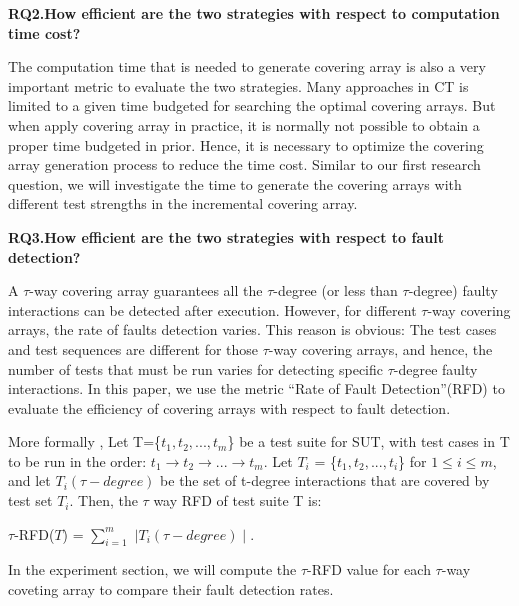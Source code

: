 \documentclass[conference]{IEEEtran}
\theoremstyle{definition}
\begin{document}
\textbf{RQ2.How efficient are the two strategies with respect to computation time cost?}

The computation time that is needed to generate covering array is also a very important metric to evaluate the two strategies. Many approaches in CT is limited to a given time budgeted for searching the optimal covering arrays.  But when apply covering array in practice, it is normally not possible to obtain a proper time budgeted in prior. Hence, it is necessary to optimize the covering array generation process to reduce the time cost. Similar to our first research question, we will investigate the time to generate the covering arrays with different test strengths in the incremental covering array.

\textbf{RQ3.How efficient are the two strategies with respect to fault detection?}

A $\tau$-way covering array guarantees all the $\tau$-degree (or less than $\tau$-degree) faulty interactions can be detected after execution. However, for different $\tau$-way covering arrays, the rate of faults detection varies.  This reason is obvious: The test cases and test sequences are different for those $\tau$-way covering arrays, and hence, the number of tests that must be run varies for detecting specific $\tau$-degree faulty interactions. In this paper, we use the metric ``Rate of Fault Detection''(RFD) \cite{nie2015combinatorial} to evaluate the efficiency of covering arrays with respect to fault detection.

More formally \cite{nie2015combinatorial}, Let T=\{$t_{1}, t_{2}, ... , t_{m}$\} be a test suite for SUT, with test cases in T to be run in the order: $t_{1} \rightarrow t_{2} \rightarrow ... \rightarrow t_{m}$. Let $T_{i}$ = \{$t_{1}, t_{2}, ... , t_{i}$\} for $1 \leq i \leq m$,  and let $T_{i}(\tau - degree)$ be the set of t-degree interactions that are covered by test set $T_{i}$. Then,
the $\tau$ way RFD of test suite T is:

$\tau$-RFD($T$) = $\sum_{i=1}^{m}$ $ \mid T_{i}(\tau - degree) \mid$.

In the experiment section, we will compute the $\tau$-RFD value for each $\tau$-way coveting array to compare their fault detection rates.
\end{document}
